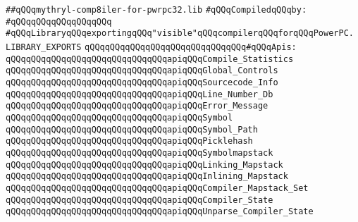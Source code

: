 \label{src/lib/core/compiler/mythryl-compiler-for-pwrpc32.lib}
\verb|##qQQqmythryl-comp8iler-for-pwrpc32.lib|\newline
\newline
\verb|#qQQqCompiledqQQqby:|\newline
\verb|#qQQqqQQqqQQqqQQqqQQq|\newline
\newline
\newline
\newline
\verb|#qQQqLibraryqQQqexportingqQQq"visible"qQQqcompilerqQQqforqQQqPowerPC.|\newline
\newline
\newline
\newline
\verb|LIBRARY_EXPORTS|\newline
\newline
\verb|qQQqqQQqqQQqqQQqqQQqqQQqqQQqqQQq#qQQqApis:|\newline
\verb|qQQqqQQqqQQqqQQqqQQqqQQqqQQqqQQqapiqQQqCompile_Statistics|\newline
\verb|qQQqqQQqqQQqqQQqqQQqqQQqqQQqqQQqapiqQQqGlobal_Controls|\newline
\verb|qQQqqQQqqQQqqQQqqQQqqQQqqQQqqQQqapiqQQqSourcecode_Info|\newline
\verb|qQQqqQQqqQQqqQQqqQQqqQQqqQQqqQQqapiqQQqLine_Number_Db|\newline
\verb|qQQqqQQqqQQqqQQqqQQqqQQqqQQqqQQqapiqQQqError_Message|\newline
\verb|qQQqqQQqqQQqqQQqqQQqqQQqqQQqqQQqapiqQQqSymbol|\newline
\verb|qQQqqQQqqQQqqQQqqQQqqQQqqQQqqQQqapiqQQqSymbol_Path|\newline
\verb|qQQqqQQqqQQqqQQqqQQqqQQqqQQqqQQqapiqQQqPicklehash|\newline
\verb|qQQqqQQqqQQqqQQqqQQqqQQqqQQqqQQqapiqQQqSymbolmapstack|\newline
\verb|qQQqqQQqqQQqqQQqqQQqqQQqqQQqqQQqapiqQQqLinking_Mapstack|\newline
\verb|qQQqqQQqqQQqqQQqqQQqqQQqqQQqqQQqapiqQQqInlining_Mapstack|\newline
\verb|qQQqqQQqqQQqqQQqqQQqqQQqqQQqqQQqapiqQQqCompiler_Mapstack_Set|\newline
\verb|qQQqqQQqqQQqqQQqqQQqqQQqqQQqqQQqapiqQQqCompiler_State|\newline
\verb|qQQqqQQqqQQqqQQqqQQqqQQqqQQqqQQqapiqQQqUnparse_Compiler_State|\newline
